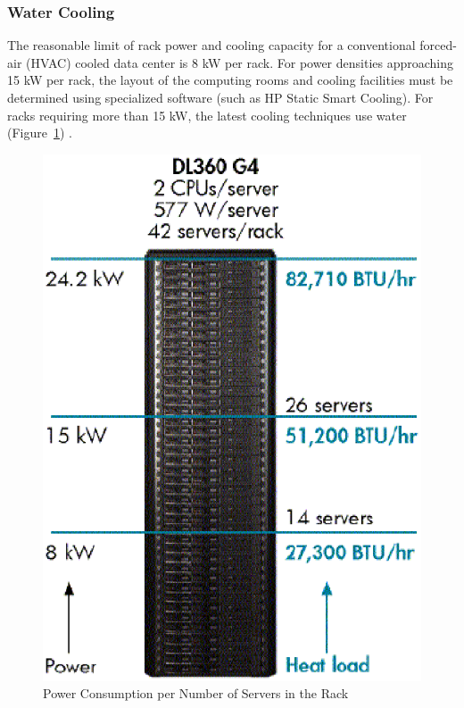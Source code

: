             \subsubsection*{Water Cooling}
                The reasonable limit of rack power and cooling capacity for a conventional forced-air (HVAC) cooled data center is 8 kW per rack. For power densities approaching 15 kW per rack, the layout of the computing rooms and cooling facilities must be determined using specialized software (such as HP Static Smart Cooling). For racks requiring more than 15 kW, the latest cooling techniques use water (Figure~\ref{fig:power_consumption_number_servers_rack}) \cite{HPCooling07}.
                \begin{figure}[h!tb]
                    \centering
                    \includegraphics[scale=0.5]{graphics/power_consumption_number_servers_rack}
                    \caption{Power Consumption per Number of Servers in the Rack}
                    \label{fig:power_consumption_number_servers_rack}
                \end{figure}
